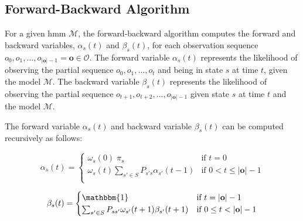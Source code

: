 \subsection{Forward-Backward Algorithm}\label{subsec:forward-backwards_algorithm}
For a given \gls{hmm} $\mathcal{M}$, the forward-backward algorithm computes the forward and backward variables, $\alpha_s(t)$ and $\beta_s(t)$, for each observation sequence $o_0, o_1, \dots, o_{|\mathbf{o}|-1} = \mathbf{o} \in \mathcal{O}$.
The forward variable $\alpha_s(t)$ represents the likelihood of observing the partial sequence $o_0, o_1, \dots, o_t$ and being in state $s$ at time $t$, given the model $\mathcal{M}$.
The backward variable $\beta_s(t)$ represents the likelihood of observing the partial sequence $o_{t+1}, o_{t+2}, \dots, o_{|\mathbf{o}|-1}$ given state $s$ at time $t$ and the model $\mathcal{M}$.





The forward variable $\alpha_s(t)$ and backward variable $\beta_s(t)$ can be computed recursively as follows:

\begin{equation}
    \alpha_s(t) =
    \begin{cases}
        \omega_s(0) \; \pi_s & \text{if } t = 0 \\
        \omega_s(t) \sum_{s' \in S} P_{s's}\alpha_{s'}(t - 1) & \text{if } 0 < t \leq |\mathbf{o}| - 1 \\
    \end{cases}
    \label{eq:forward-recursive}
\end{equation}


\begin{equation}
    \beta_s(t) =
    \begin{cases}
        \mathbbm{1} & \text{if } t = |\mathbf{o}| - 1 \\
        \sum_{s' \in S} P_{ss'} \omega_{s'}(t + 1) \beta_{s'}(t + 1) & \text{if } 0 \leq t < |\mathbf{o}| - 1 \\
    \end{cases}
    \label{eq:backward-recursive}
\end{equation}


